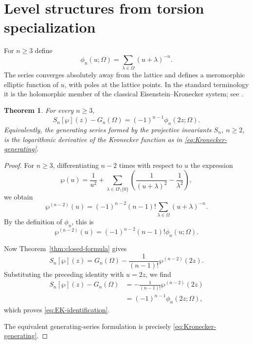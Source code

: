 \documentclass[11pt]{amsart}
\newtheorem{thm}{Theorem}[section]
\theoremstyle{definition}
\theoremstyle{remark}
\numberwithin{equation}{section}
\begin{document}
\section{Level structures from torsion specialization}\label{sec:torsion}

For $n\geq3$ define
\begin{equation}\label{eq:phi-n}
\phi_n(u;\Omega)
=
\sum_{\lambda\in\Omega}(u+\lambda)^{-n}.
\end{equation}
The series converges absolutely away from the lattice and defines a meromorphic elliptic function of $u$, with poles at the lattice points. In the standard terminology it is the holomorphic member of the classical Eisenstein--Kronecker system; see \cite{weil,sprang}.

\begin{thm}\label{thm:EK-identification}
For every $n\geq3$,
\begin{equation}\label{eq:EK-identification}
S_n[\wp](z)-G_n(\Omega)
=
(-1)^{n-1}\phi_n(2z;\Omega).
\end{equation}
Equivalently, the generating series formed by the projective invariants
$S_n$, $n\geq2$, is the logarithmic derivative of the Kronecker function as
in \eqref{eq:Kronecker-generating}.
\end{thm}


\begin{proof}
For \(n\geq3\), differentiating \(n-2\) times with
respect to \(u\) the expression
\[
\wp(u)
=
\frac{1}{u^2}
+
\sum_{\lambda\in\Omega\setminus\{0\}}
\left(
\frac{1}{(u+\lambda)^2}-\frac{1}{\lambda^2}
\right),
\]
we obtain
\[
\wp^{(n-2)}(u)
=
(-1)^{n-2}(n-1)!
\sum_{\lambda\in\Omega}(u+\lambda)^{-n}.
\]
By the definition of \(\phi_n\), this is
\[
\wp^{(n-2)}(u)
=
(-1)^{n-2}(n-1)!\phi_n(u;\Omega).
\]

Now Theorem~\ref{thm:closed-formula} gives
\[
S_n[\wp](z)
=
G_n(\Omega)
-
\frac{1}{(n-1)!}\wp^{(n-2)}(2z).
\]
Substituting the preceding identity with \(u=2z\), we find
\begin{align*}
S_n[\wp](z)-G_n(\Omega)
&=
-\frac{1}{(n-1)!}
   \wp^{(n-2)}(2z)\\
&=
(-1)^{n-1}\phi_n(2z;\Omega),
\end{align*}
which proves \eqref{eq:EK-identification}.

The equivalent generating-series formulation is precisely
\eqref{eq:Kronecker-generating}.
\end{proof}
\end{document}
